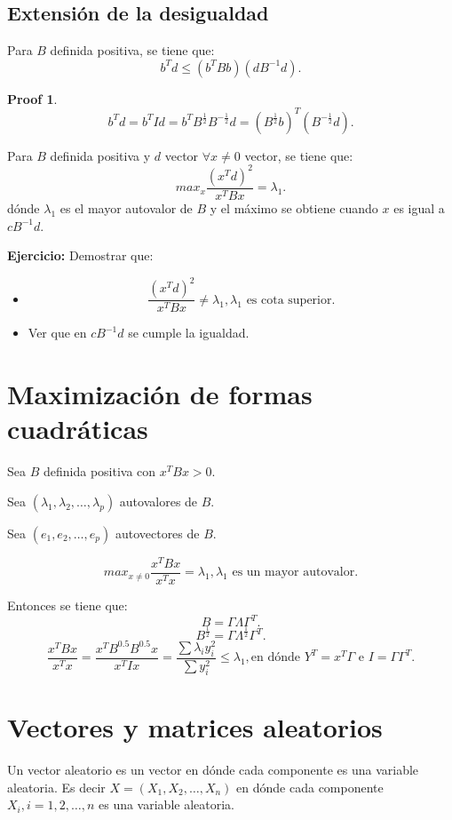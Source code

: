 \documentclass{article}
\newtheorem{myprf}{Proof}
\begin{document}
\subsection{Extensión de la desigualdad}
Para $B$ definida positiva, se tiene que:
\[ b^{T}d \leq (b^{T}Bb)(dB^{-1}d).\]
\begin{myprf}
	\[ b^{T}d=b^{T}Id=b^{T}B^{\frac{1}{2}}B^{-\frac{1}{2}}d=(B^{\frac{1}{2}}b)^{T}(B^{-\frac{1}{2}}d).\]
\end{myprf}

Para $B$ definida positiva y $d$ vector $\forall x \neq 0$ vector, se tiene que:
\[ max_{x} \frac{(x^{T}d)^{2}}{x^{T}Bx}=\lambda_{1}.\]
dónde $\lambda_{1}$ es el mayor autovalor de $B$ y el máximo se obtiene cuando $x$ es igual a $cB^{-1}d$.

\textbf{Ejercicio: }Demostrar que:
\begin{itemize}
	\item \[ \frac{(x^{T}d)^{2}}{x^{T}Bx} \neq \lambda_{1}, \text{$\lambda_{1}$ es cota superior}.\]
\item Ver que en $cB^{-1}d$ se cumple la igualdad.
\end{itemize}

\section{Maximización de formas cuadráticas}
Sea $B$ definida positiva con $x^{T}Bx > 0$.

Sea $(\lambda_{1},\lambda_{2},\ldots,\lambda_{p})$ autovalores de $B$.

Sea $(e_{1},e_{2},\ldots,e_{p})$ autovectores de $B$.

\[ max_{x \neq 0} \frac{x^{T}Bx}{x^{T}x}=\lambda_{1}, \text{$\lambda_{1}$ es un mayor autovalor}.\]

Entonces se tiene que:
\[ B=\Gamma \Lambda \Gamma^{T}.\]
\[ B^{\frac{1}{2}}=\Gamma \Lambda^{\frac{1}{2}} \Gamma ^{T}.\]
\[ \frac{x^{T}Bx}{x^{T}x}=\frac{x^{T}B^{0.5}B^{0.5}x}{x^{T}Ix}=\frac{\sum \lambda_{i} y_{i}^{2}}{\sum y_{i}^{2}} \leq \lambda_{1}, \text{en dónde $Y^{T}=x^{T}\Gamma$ e $I = \Gamma \Gamma^{T}$}.\]

\section{Vectores y matrices aleatorios}
Un vector aleatorio es un vector en dónde cada componente es una variable aleatoria. Es decir $X = (X_{1},X_{2},\ldots,X_{n})$ en dónde cada componente $X_{i}, i=1,2,\ldots,n$ es una variable aleatoria.
\end{document}
